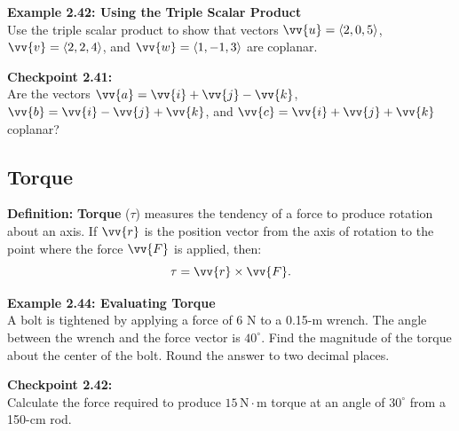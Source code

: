 \documentclass{article}
\begin{document}
\begin{examplebox}
    \textbf{Example 2.42: Using the Triple Scalar Product} \\
    Use the triple scalar product to show that vectors \(\vv{u} = \langle 2, 0, 5 \rangle\), \(\vv{v} = \langle 2, 2, 4 \rangle\), and \(\vv{w} = \langle 1, -1, 3 \rangle\) are coplanar.
\end{examplebox}

\begin{exercisebox}
    \textbf{Checkpoint 2.41:} \\
    Are the vectors \(\vv{a} = \vv{i} + \vv{j} - \vv{k}\), \(\vv{b} = \vv{i} - \vv{j} + \vv{k}\), and \(\vv{c} = \vv{i} + \vv{j} + \vv{k}\) coplanar?
\end{exercisebox}

\subsection*{Torque}

\begin{definitionbox}
    \textbf{Definition:} \textbf{Torque} (\(\tau\)) measures the tendency of a force to produce rotation about an axis. If \(\vv{r}\) is the position vector from the axis of rotation to the point where the force \(\vv{F}\) is applied, then:
    \[
    \tau = \vv{r} \times \vv{F}.
    \]
\end{definitionbox}

\begin{examplebox}
    \textbf{Example 2.44: Evaluating Torque} \\
    A bolt is tightened by applying a force of 6 N to a 0.15-m wrench. The angle between the wrench and the force vector is \(40^\circ\). Find the magnitude of the torque about the center of the bolt. Round the answer to two decimal places.
\end{examplebox}

\begin{exercisebox}
    \textbf{Checkpoint 2.42:} \\
    Calculate the force required to produce \(15 \, \text{N} \cdot \text{m}\) torque at an angle of \(30^\circ\) from a 150-cm rod.
\end{exercisebox}

\cleardoublepage
{}


\normalsize

\setcounter{page}{1}
\end{document}

